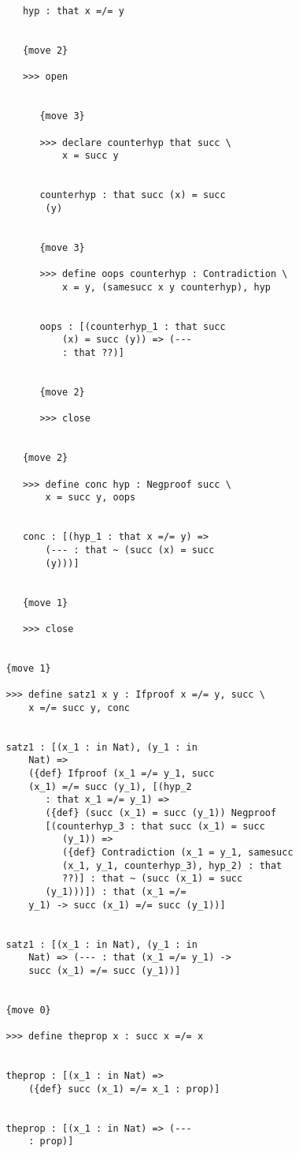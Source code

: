 \begin{verbatim}
      hyp : that x =/= y


      {move 2}

      >>> open


         {move 3}

         >>> declare counterhyp that succ \
             x = succ y


         counterhyp : that succ (x) = succ 
          (y)


         {move 3}

         >>> define oops counterhyp : Contradiction \
             x = y, (samesucc x y counterhyp), hyp


         oops : [(counterhyp_1 : that succ 
             (x) = succ (y)) => (--- 
             : that ??)]


         {move 2}

         >>> close


      {move 2}

      >>> define conc hyp : Negproof succ \
          x = succ y, oops


      conc : [(hyp_1 : that x =/= y) => 
          (--- : that ~ (succ (x) = succ 
          (y)))]


      {move 1}

      >>> close


   {move 1}

   >>> define satz1 x y : Ifproof x =/= y, succ \
       x =/= succ y, conc


   satz1 : [(x_1 : in Nat), (y_1 : in 
       Nat) => 
       ({def} Ifproof (x_1 =/= y_1, succ 
       (x_1) =/= succ (y_1), [(hyp_2 
          : that x_1 =/= y_1) => 
          ({def} (succ (x_1) = succ (y_1)) Negproof 
          [(counterhyp_3 : that succ (x_1) = succ 
             (y_1)) => 
             ({def} Contradiction (x_1 = y_1, samesucc 
             (x_1, y_1, counterhyp_3), hyp_2) : that 
             ??)] : that ~ (succ (x_1) = succ 
          (y_1)))]) : that (x_1 =/= 
       y_1) -> succ (x_1) =/= succ (y_1))]


   satz1 : [(x_1 : in Nat), (y_1 : in 
       Nat) => (--- : that (x_1 =/= y_1) -> 
       succ (x_1) =/= succ (y_1))]


   {move 0}

   >>> define theprop x : succ x =/= x


   theprop : [(x_1 : in Nat) => 
       ({def} succ (x_1) =/= x_1 : prop)]


   theprop : [(x_1 : in Nat) => (--- 
       : prop)]



\end{verbatim}
